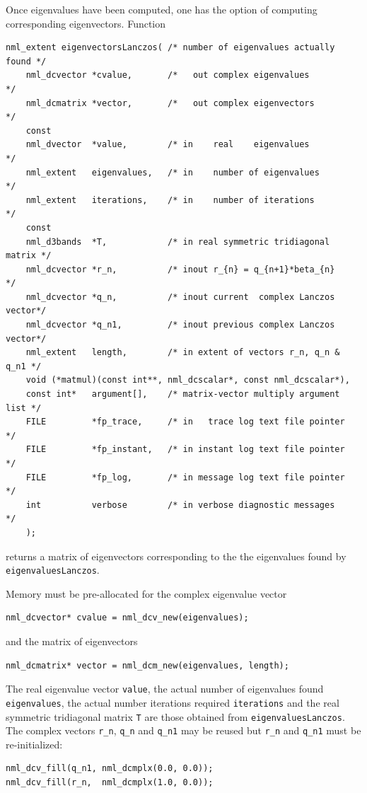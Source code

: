 \documentclass[twoside,12pt]{article}
\begin{document}
Once eigenvalues have been computed, one has the option of computing
corresponding eigenvectors.  Function
\begin{verbatim}
nml_extent eigenvectorsLanczos( /* number of eigenvalues actually found */
    nml_dcvector *cvalue,       /*   out complex eigenvalues            */
    nml_dcmatrix *vector,       /*   out complex eigenvectors           */
    const
    nml_dvector  *value,        /* in    real    eigenvalues            */
    nml_extent   eigenvalues,   /* in    number of eigenvalues          */
    nml_extent   iterations,    /* in    number of iterations           */
    const
    nml_d3bands  *T,            /* in real symmetric tridiagonal matrix */
    nml_dcvector *r_n,          /* inout r_{n} = q_{n+1}*beta_{n}       */
    nml_dcvector *q_n,          /* inout current  complex Lanczos vector*/
    nml_dcvector *q_n1,         /* inout previous complex Lanczos vector*/
    nml_extent   length,        /* in extent of vectors r_n, q_n & q_n1 */
    void (*matmul)(const int**, nml_dcscalar*, const nml_dcscalar*),
    const int*   argument[],    /* matrix-vector multiply argument list */
    FILE         *fp_trace,     /* in   trace log text file pointer     */
    FILE         *fp_instant,   /* in instant log text file pointer     */
    FILE         *fp_log,       /* in message log text file pointer     */
    int          verbose        /* in verbose diagnostic messages       */
    );
\end{verbatim}
returns a matrix of eigenvectors corresponding to
the the eigenvalues found by {\tt eigenvaluesLanczos}.

Memory must be pre-allocated for the complex eigenvalue vector
\begin{verbatim}
nml_dcvector* cvalue = nml_dcv_new(eigenvalues);
\end{verbatim}
and the matrix of eigenvectors
\begin{verbatim}
nml_dcmatrix* vector = nml_dcm_new(eigenvalues, length);
\end{verbatim}
The real eigenvalue vector {\tt value},
the actual number of eigenvalues found {\tt eigenvalues},
the actual number iterations required {\tt iterations} and
the real symmetric tridiagonal matrix {\tt T}
are those obtained from {\tt eigenvaluesLanczos}.
The complex vectors {\tt r\_n}, {\tt q\_n} and {\tt q\_n1}
may be reused but {\tt r\_n} and {\tt q\_n1} must be re-initialized:
\begin{verbatim}
nml_dcv_fill(q_n1, nml_dcmplx(0.0, 0.0));
nml_dcv_fill(r_n,  nml_dcmplx(1.0, 0.0));
\end{verbatim}
\end{document}

